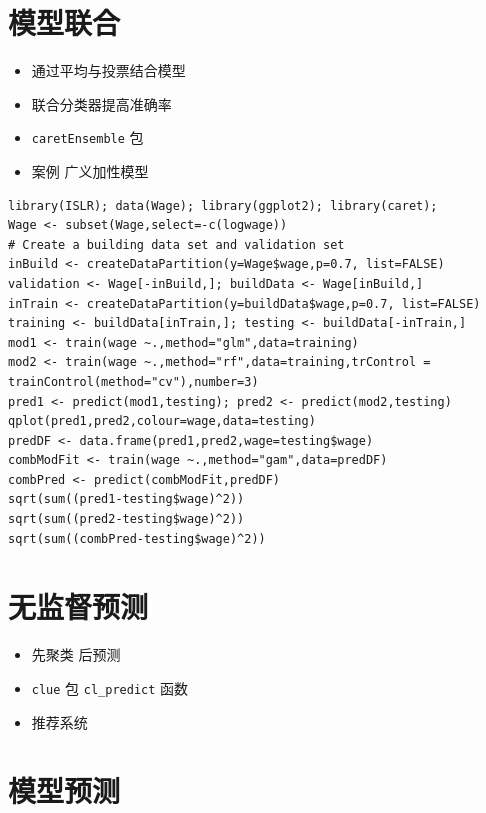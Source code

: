 \documentclass[]{book}
\providecommand{\tightlist}{%
  \setlength{\itemsep}{0pt}\setlength{\parskip}{0pt}}
\begin{document}
\hypertarget{ux6a21ux578bux8054ux5408}{%
\section{模型联合}\label{ux6a21ux578bux8054ux5408}}

\begin{itemize}
\tightlist
\item
  通过平均与投票结合模型
\item
  联合分类器提高准确率
\item
  \texttt{caretEnsemble} 包
\item
  案例 广义加性模型
\end{itemize}

\begin{verbatim}
library(ISLR); data(Wage); library(ggplot2); library(caret);
Wage <- subset(Wage,select=-c(logwage))
# Create a building data set and validation set
inBuild <- createDataPartition(y=Wage$wage,p=0.7, list=FALSE)
validation <- Wage[-inBuild,]; buildData <- Wage[inBuild,]
inTrain <- createDataPartition(y=buildData$wage,p=0.7, list=FALSE)
training <- buildData[inTrain,]; testing <- buildData[-inTrain,]
mod1 <- train(wage ~.,method="glm",data=training)
mod2 <- train(wage ~.,method="rf",data=training,trControl = trainControl(method="cv"),number=3)
pred1 <- predict(mod1,testing); pred2 <- predict(mod2,testing)
qplot(pred1,pred2,colour=wage,data=testing)
predDF <- data.frame(pred1,pred2,wage=testing$wage)
combModFit <- train(wage ~.,method="gam",data=predDF)
combPred <- predict(combModFit,predDF)
sqrt(sum((pred1-testing$wage)^2))
sqrt(sum((pred2-testing$wage)^2))
sqrt(sum((combPred-testing$wage)^2))
\end{verbatim}

\hypertarget{ux65e0ux76d1ux7763ux9884ux6d4b}{%
\section{无监督预测}\label{ux65e0ux76d1ux7763ux9884ux6d4b}}

\begin{itemize}
\tightlist
\item
  先聚类 后预测
\item
  \texttt{clue} 包 \texttt{cl\_predict} 函数
\item
  推荐系统
\end{itemize}

\hypertarget{ux6a21ux578bux9884ux6d4b}{%
\section{模型预测}\label{ux6a21ux578bux9884ux6d4b}}
\end{document}
